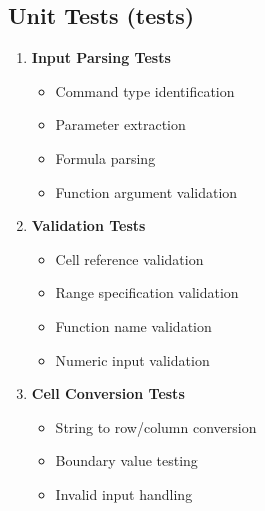 \documentclass{article}
\begin{document}
\subsection{Unit Tests (tests)}
\begin{enumerate}
    \item \textbf{Input Parsing Tests}
    \begin{itemize}
        \item Command type identification
        \item Parameter extraction
        \item Formula parsing
        \item Function argument validation
    \end{itemize}

    \item \textbf{Validation Tests}
    \begin{itemize}
        \item Cell reference validation
        \item Range specification validation
        \item Function name validation
        \item Numeric input validation
    \end{itemize}

    \item \textbf{Cell Conversion Tests}
    \begin{itemize}
        \item String to row/column conversion
        \item Boundary value testing
        \item Invalid input handling
    \end{itemize}
\end{enumerate}
\end{document}
